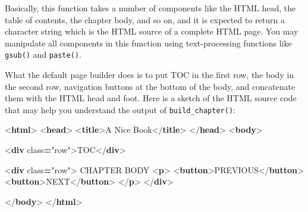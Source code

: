 \documentclass[
  12pt,
]{krantz}
\newenvironment{Shaded}{\begin{snugshade}}{\end{snugshade}}
\newcommand{\DataTypeTok}[1]{\textcolor[rgb]{0.13,0.29,0.53}{#1}}
\newcommand{\KeywordTok}[1]{\textcolor[rgb]{0.13,0.29,0.53}{\textbf{#1}}}
\newcommand{\NormalTok}[1]{#1}
\newcommand{\OperatorTok}[1]{\textcolor[rgb]{0.81,0.36,0.00}{\textbf{#1}}}
\newcommand{\OtherTok}[1]{\textcolor[rgb]{0.56,0.35,0.01}{#1}}
\newcommand{\StringTok}[1]{\textcolor[rgb]{0.31,0.60,0.02}{#1}}
\theoremstyle{definition}
\theoremstyle{definition}
\theoremstyle{definition}
\theoremstyle{definition}
\theoremstyle{remark}
\begin{document}
Basically, this function takes a number of components like the HTML head, the table of contents, the chapter body, and so on, and it is expected to return a character string which is the HTML source of a complete HTML page. You may manipulate all components in this function using text-processing functions like \texttt{gsub()} and \texttt{paste()}.

What the default page builder does is to put TOC in the first row, the body in the second row, navigation buttons at the bottom of the body, and concatenate them with the HTML head and foot. Here is a sketch of the HTML source code that may help you understand the output of \texttt{build\_chapter()}:

\begin{Shaded}
\begin{Highlighting}[]
\DataTypeTok{\textless{}}\KeywordTok{html}\DataTypeTok{\textgreater{}}
  \DataTypeTok{\textless{}}\KeywordTok{head}\DataTypeTok{\textgreater{}}
    \DataTypeTok{\textless{}}\KeywordTok{title}\DataTypeTok{\textgreater{}}\NormalTok{A Nice Book}\DataTypeTok{\textless{}/}\KeywordTok{title}\DataTypeTok{\textgreater{}}
  \DataTypeTok{\textless{}/}\KeywordTok{head}\DataTypeTok{\textgreater{}}
  \DataTypeTok{\textless{}}\KeywordTok{body}\DataTypeTok{\textgreater{}}

    \DataTypeTok{\textless{}}\KeywordTok{div}\OtherTok{ class}\OperatorTok{=}\StringTok{"row"}\DataTypeTok{\textgreater{}}\NormalTok{TOC}\DataTypeTok{\textless{}/}\KeywordTok{div}\DataTypeTok{\textgreater{}}

    \DataTypeTok{\textless{}}\KeywordTok{div}\OtherTok{ class}\OperatorTok{=}\StringTok{"row"}\DataTypeTok{\textgreater{}}
\NormalTok{      CHAPTER BODY}
      \DataTypeTok{\textless{}}\KeywordTok{p}\DataTypeTok{\textgreater{}}
        \DataTypeTok{\textless{}}\KeywordTok{button}\DataTypeTok{\textgreater{}}\NormalTok{PREVIOUS}\DataTypeTok{\textless{}/}\KeywordTok{button}\DataTypeTok{\textgreater{}}
        \DataTypeTok{\textless{}}\KeywordTok{button}\DataTypeTok{\textgreater{}}\NormalTok{NEXT}\DataTypeTok{\textless{}/}\KeywordTok{button}\DataTypeTok{\textgreater{}}
      \DataTypeTok{\textless{}/}\KeywordTok{p}\DataTypeTok{\textgreater{}}
    \DataTypeTok{\textless{}/}\KeywordTok{div}\DataTypeTok{\textgreater{}}

  \DataTypeTok{\textless{}/}\KeywordTok{body}\DataTypeTok{\textgreater{}}
\DataTypeTok{\textless{}/}\KeywordTok{html}\DataTypeTok{\textgreater{}}
\end{Highlighting}
\end{Shaded}
\end{document}
